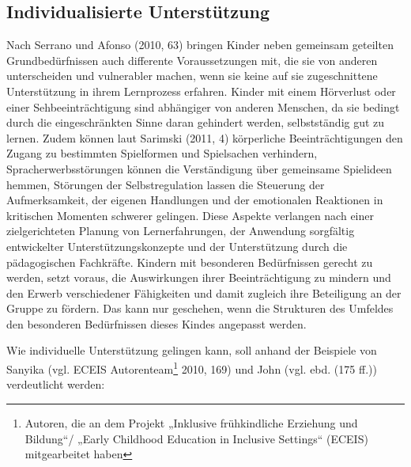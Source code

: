 \subsection{Individualisierte Unterstützung} 
\label{Individualisierung}
Nach Serrano und Afonso (2010, 63) bringen Kinder neben gemeinsam geteilten Grundbe\-dürfnissen auch differente Voraussetzungen mit, die sie von anderen unterscheiden und vulnerabler machen, wenn sie keine auf sie zugeschnittene Unterstützung in ihrem Lernprozess erfahren. Kinder mit einem Hörverlust oder einer Sehbeeinträchtigung sind abhängiger von anderen Menschen, da sie bedingt durch die eingeschränkten Sinne daran gehindert werden, selbstständig gut zu lernen. Zudem können laut Sarimski (2011, 4) körperliche Beeinträchtigungen den Zugang zu bestimmten Spielformen und Spielsachen verhindern, Spracherwerbsstörungen können die Verständigung über gemeinsame Spielideen hemmen, Störungen der Selbstregulation lassen die Steuerung der Aufmerksamkeit, der eigenen Handlungen und der emotionalen Reaktionen in kritischen Momenten schwerer gelingen.    
Diese Aspekte verlangen nach einer zielgerichteten Planung von Lernerfahrungen, der Anwendung sorgfältig entwickelter Unterstützungskonzepte und der Unterstützung durch die pädagogischen Fachkräfte. Kindern mit besonderen Bedürfnissen gerecht zu werden, setzt voraus, die Auswirkungen ihrer Beeinträchtigung zu mindern und den Erwerb verschiedener Fähigkeiten und damit zugleich ihre Beteiligung an der Gruppe zu fördern. Das kann nur geschehen, wenn die Strukturen des Umfeldes den besonderen Bedürfnissen dieses Kindes angepasst werden. 

Wie individuelle Unterstützung gelingen kann, soll anhand der Beispiele von Sanyika (vgl. ECEIS Autorenteam\footnote{Autoren, die an dem Projekt „Inklusive frühkindliche Erziehung und Bildung“/ „Early Childhood Education in Inclusive Settings“ (ECEIS) mitgearbeitet haben} 2010, 169) und John (vgl. ebd. (175 ff.)) verdeutlicht werden:

